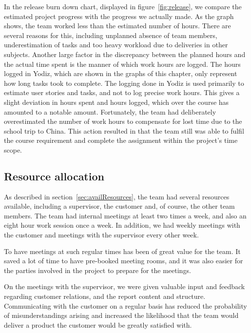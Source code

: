 \noindent In the release burn down chart, displayed in figure~\ref{fig:release}, we compare the estimated project progress with the progress we actually made. As the graph shows, the team worked less than the estimated number of hours. There are several reasons for this, including unplanned absence of team members, underestimation of tasks and too heavy workload due to deliveries in other subjects. Another large factor in the discrepancy between the planned hours and the actual time spent is the manner of which work hours are logged. The hours logged in Yodiz, which are shown in the graphs of this chapter, only represent how long tasks took to complete. The logging done in Yodiz is used primarily to estimate user stories and tasks, and not to log precise work hours. This gives a slight deviation in hours spent and hours logged, which over the course has amounted to a notable amount. Fortunately, the team had deliberately overestimated the number of work hours to compensate for lost time due to the school trip to China. This action resulted in that the team still was able to fulfil the course requirement and complete the assignment within the project's time scope.


\subsection{Resource allocation}
As described in section~\ref{sec:availResources}, the team had several resources available, including a supervisor, the customer and, of course, the other team members. The team had internal meetings at least two times a week, and also an eight hour work session once a week. In addition, we had weekly meetings with the customer and meetings with the supervisor every other week.

To have meetings at such regular times has been of great value for the team. It saved a lot of time to have pre-booked meeting rooms, and it was also easier for the parties involved in the project to prepare for the meetings.

On the meetings with the supervisor, we were given valuable input and feedback regarding customer relations, and the report content and structure. 
Communicating with the customer on a regular basis has reduced the probability of misunderstandings arising and increased the likelihood that the team would deliver a product the customer would be greatly satisfied with. 


